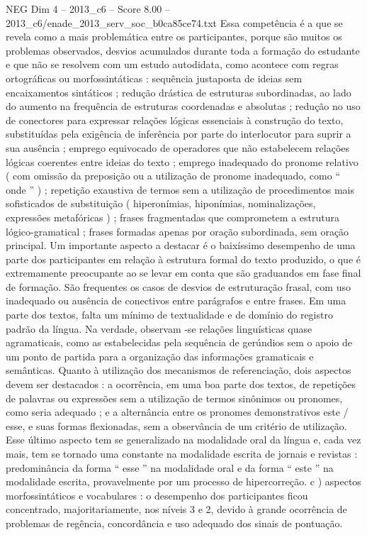 \begin{textsample}{NEG Dim 4 – 2013\_c6 – Score 8.00 – 2013\_c6/enade\_2013\_serv\_soc\_b0ca85ce74.txt}
Essa competência é a que se revela como a mais problemática entre os participantes, porque são muitos os problemas observados, desvios acumulados durante toda a formação do estudante e que não se resolvem com um estudo autodidata, como acontece com regras ortográficas ou morfossintáticas : sequência justaposta de ideias sem encaixamentos sintáticos ; redução drástica de estruturas subordinadas, ao lado do aumento na frequência de estruturas coordenadas e absolutas ; redução no uso de conectores para expressar relações lógicas essenciais à construção do texto, substituídas pela exigência de inferência por parte do interlocutor para suprir a sua ausência ; emprego equivocado de operadores que não estabelecem relações lógicas coerentes entre ideias do texto ; emprego inadequado do pronome relativo ( com omissão da preposição ou a utilização de pronome inadequado, como “ onde ” ) ; repetição exaustiva de termos sem a utilização de procedimentos mais sofisticados de substituição ( hiperonímias, hiponímias, nominalizações, expressões metafóricas ) ; frases fragmentadas que comprometem a estrutura lógico-gramatical ; frases formadas apenas por oração subordinada, sem oração principal.
Um importante aspecto a destacar é o baixíssimo desempenho de uma parte dos participantes em relação à estrutura formal do texto produzido, o que é extremamente preocupante ao se levar em conta que são graduandos em fase final de formação.
São frequentes os casos de desvios de estruturação frasal, com uso inadequado ou ausência de conectivos entre parágrafos e entre frases.
Em uma parte dos textos, falta um mínimo de textualidade e de domínio do registro padrão da língua.
Na verdade, observam -se relações linguísticas quase agramaticais, como as estabelecidas pela sequência de gerúndios sem o apoio de um ponto de partida para a organização das informações gramaticais e semânticas.
Quanto à utilização dos mecanismos de referenciação, dois aspectos devem ser destacados : a ocorrência, em uma boa parte dos textos, de repetições de palavras ou expressões sem a utilização de termos sinônimos ou pronomes, como seria adequado ; e a alternância entre os pronomes demonstrativos este / esse, e suas formas flexionadas, sem a observância de um critério de utilização.
Esse último aspecto tem se generalizado na modalidade oral da língua e, cada vez mais, tem se tornado uma constante na modalidade escrita de jornais e revistas : predominância da forma “ esse ” na modalidade oral e da forma “ este ” na modalidade escrita, provavelmente por um processo de hipercorreção. c ) aspectos morfossintáticos e vocabulares : o desempenho dos participantes ficou concentrado, majoritariamente, nos níveis 3 e 2, devido à grande ocorrência de problemas de regência, concordância e uso adequado dos sinais de pontuação.

\end{textsample}
